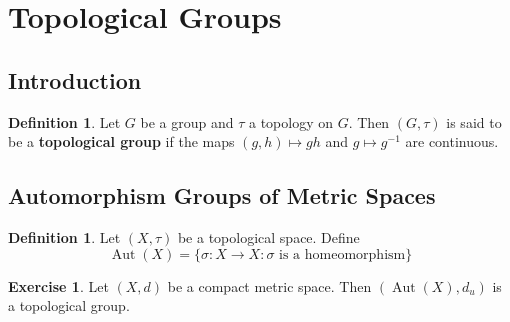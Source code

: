 \documentclass[12pt]{amsart}
\theoremstyle{definition}
\newtheorem{defn}[definition]{Definition}
\newtheorem{ex}[definition]{Exercise}
\newcommand{\sig}{\sigma}
\DeclareMathOperator{\Aut}{Aut}
\begin{document}
	\newpage
	
	
	
	
	
	
	
	
	
	
	
	
	
	
	
	
	
	
	\newpage
	\section{Topological Groups}
	\subsection{Introduction}
	
	\begin{defn}
	Let $G$ be a group and $\tau$ a topology on $G$. Then $(G, \tau)$ is said to be a \textbf{topological group} if the maps $(g,h) \mapsto gh$ and $g \mapsto g^{-1}$ are continuous. 
	\end{defn}	
	
	\subsection{Automorphism Groups of Metric Spaces}
	
	\begin{defn}
	Let $(X, \tau)$ be a topological space. Define $$\Aut(X) = \{\sig:X\rightarrow X: \sig \text{ is a homeomorphism} \}$$ 
	\end{defn}	
	
	\begin{ex}
	Let $(X, d)$ be a compact metric space. Then $(\Aut(X), d_{u} )$ is a topological group.
	\end{ex}
	
\end{document}
